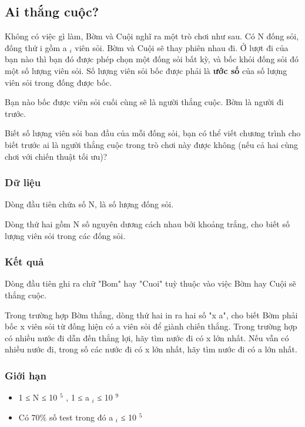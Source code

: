 







\subsection{   Ai thắng cuộc?  }

   Không có việc gì làm, Bờm và Cuội nghĩ ra một trò chơi như sau. Có N đống sỏi, đống thứ i gồm a   $_    i   $   viên sỏi. Bờm và Cuội sẽ thay phiên nhau đi. Ở lượt đi của bạn nào thì bạn đó được phép chọn một đống sỏi bất kỳ, và bốc  khỏi đống sỏi đó một số lượng viên sỏi. Số lượng viên sỏi bốc được phải là   \textbf{    ước số   }   của số lượng viên sỏi trong đống được bốc.  

   Bạn nào bốc được viên sỏi cuối cùng sẽ là người thắng cuộc. Bờm là người đi trước.  

   Biết số lượng viên sỏi ban đầu của mỗi đống sỏi, bạn có thể viết chương trình cho biết trước ai là người thắng cuộc trong trò chơi này được không (nếu cả hai cùng chơi với chiến thuật tối ưu)?  

\subsubsection{   Dữ liệu  }

   Dòng đầu tiên chứa số N, là số lượng đống sỏi.  

   Dòng thứ hai gồm N số nguyên dương cách nhau bởi khoảng trắng, cho biết số lượng viên sỏi trong các đống sỏi.  

\subsubsection{   Kết quả  }

   Dòng đầu tiên ghi ra chữ "Bom" hay "Cuoi" tuỳ thuộc vào việc Bờm hay Cuội sẽ thắng cuộc.  

   Trong trường hợp Bờm thắng, dòng thứ hai in ra hai số "x a", cho biết Bờm phải bốc x viên sỏi từ đống hiện có a viên sỏi để giành chiến thắng. Trong trường hợp có nhiều nước đi dẫn đến thắng lợi, hãy tìm nước đi có x lớn nhất. Nếu vẫn có nhiều nước đi, trong số các nước đi có x lớn nhất, hãy tìm nước đi có a lớn nhất.  

\subsubsection{   Giới hạn  }
\begin{itemize}
	\item     1 ≤ N ≤ 10    $^     5    $    , 1 ≤ a    $_     i    $    ≤ 10    $^     9    $
	\item     Có 70\% số test trong đó a    $_     i    $    ≤ 10    $^     5    $
\end{itemize}

